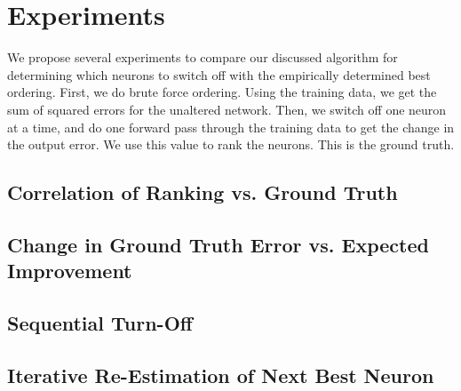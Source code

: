 
\section{Experiments}
We propose several experiments to compare our discussed algorithm for determining which neurons to switch off with the empirically determined best ordering. First, we do brute force ordering. Using the training data, we get the sum of squared errors for the unaltered network. Then, we switch off one neuron at a time, and do one forward pass through the training data to get the change in the output error. We use this value to rank the neurons. This is the ground truth. 
\subsection{Correlation of Ranking vs. Ground Truth}
\subsection{Change in Ground Truth Error vs. Expected Improvement}
\subsection{Sequential Turn-Off}
\subsection{Iterative Re-Estimation of Next Best Neuron}